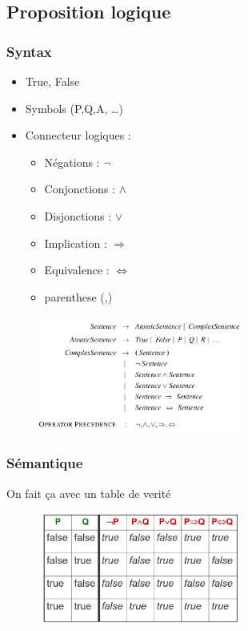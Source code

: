 	\subsection{Proposition logique}
		\subsubsection{Syntax}
			\begin{itemize}
				\item True, False
				\item Symbols (P,Q,A, \dots)
				\item Connecteur logiques :
				\begin{itemize}
					\item Négations : $\neg$
					\item Conjonctions : $\wedge$
					\item Disjonctions : $\vee$
					\item Implication : $\Rightarrow$
					\item Equivalence : $\Leftrightarrow$
					\item parenthese (,)
				\end{itemize}
			\end{itemize}
			
			\begin{figure}[htp]	
				\centering
				\includegraphics[width=0.6\textwidth]{img/KBA3.png}
			\end{figure}
			
			\subsubsection{Sémantique}
			On fait ça avec un table de verité
			\begin{figure}[H]	
				\centering
				\includegraphics[width=0.6\textwidth]{img/KBA4.png}
			\end{figure}
			
